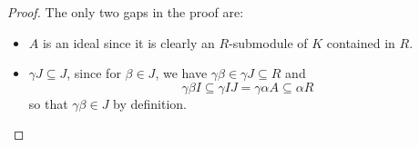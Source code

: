 \begin{proof} The only two gaps in the proof are:
\begin{itemize}
\item $A$ is an ideal since it is clearly an $R$-submodule of $K$ contained in $R$.
\item $\gamma J \subseteq J$, since for $\beta \in J$, we have $\gamma\beta \in \gamma J \subseteq R$ and 
	\[ \gamma\beta I \subseteq \gamma IJ = \gamma\alpha A \subseteq \alpha R \]
	so that $\gamma\beta \in J$ by definition.
\end{itemize}
\end{proof}
